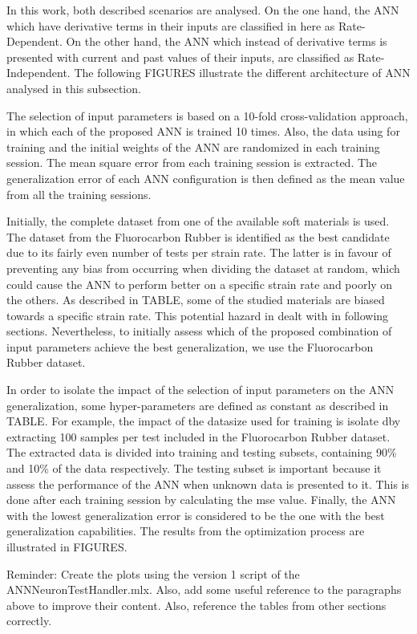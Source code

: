In this work, both described scenarios are analysed. On the one hand, the ANN which have derivative terms in their inputs are classified in here as Rate-Dependent. On the other hand, the ANN which instead of derivative terms is presented with current and past values of their inputs, are classified as Rate-Independent. The following FIGURES illustrate the different architecture of ANN analysed in this subsection.



The selection of input parameters is based on a 10-fold cross-validation approach, in which each of the proposed ANN is trained 10 times. Also, the data using for training and the initial weights of the ANN are randomized in each training session. The mean square error from each training session is extracted. The generalization error of each ANN configuration is then defined as the mean value from all the training sessions. 

Initially, the complete dataset from one of the available soft materials is used. The dataset from the Fluorocarbon Rubber is identified as the best candidate due to its fairly even number of tests per strain rate. The latter is in favour of preventing any bias from occurring when dividing the dataset at random, which could cause the ANN to perform better on a specific strain rate and poorly on the others. As described in TABLE, some of the studied materials are biased towards a specific strain rate. This potential hazard in dealt with in following sections. Nevertheless, to initially assess which of the proposed combination of input parameters achieve the best generalization, we use the Fluorocarbon Rubber dataset. 

In order to isolate the impact of the selection of input parameters on the ANN generalization, some hyper-parameters are defined as constant as described in TABLE. For example, the impact of the datasize used for training is isolate dby extracting 100 samples per test included in the Fluorocarbon Rubber dataset. The extracted data is divided into training and testing subsets, containing 90\% and 10\% of the data respectively. The testing subset is important because it assess the performance of the ANN when unknown data is presented to it. This is done after each training session by calculating the mse value. Finally, the ANN with the lowest generalization error is considered to be the one with the best generalization capabilities. The results from the optimization process are illustrated in FIGURES.

Reminder: Create the plots using the version 1 script of the ANNNeuronTestHandler.mlx. Also, add some useful reference to the paragraphs above to improve their content. Also, reference the tables from other sections correctly.


